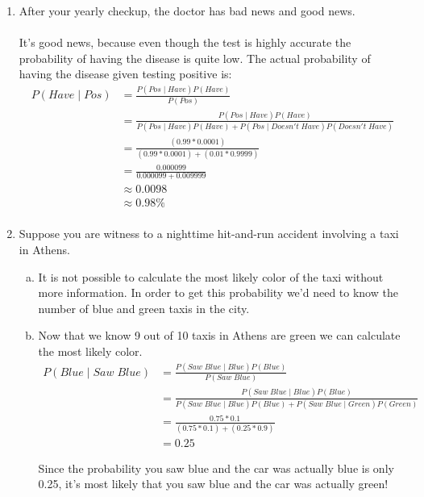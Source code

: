 \documentclass[10pt,draftclsnofoot,onecolumn]{IEEEtran}
\begin{document}
\begin{enumerate}
  \item After your yearly checkup, the doctor has bad news and good news. \\ \\
  It's good news, because even though the test is highly accurate the probability of having the disease is quite low.
  The actual probability of having the disease given testing positive is:
  \begin{align*}
    P(Have \; | \; Pos) &= \frac{P(Pos \; | \; Have)P(Have)}{P(Pos)} \\
    &= \frac{P(Pos \; | \; Have)P(Have)}{P(Pos \; | \; Have)P(Have) + P(Pos \; | \; Doesn't \; Have)P(Doesn't \; Have)} \\
    &= \frac{(0.99*0.0001)}{(0.99*0.0001)+(0.01*0.9999)} \\
    &= \frac{0.000099}{0.000099+0.009999} \\
    &\approx 0.0098 \\
    &\approx 0.98\% \\
  \end{align*}

  \item Suppose you are witness to a nighttime hit-and-run accident involving a taxi in Athens.

  \begin{enumerate}[a)]
    \item It is not possible to calculate the most likely color of the taxi without more information.
    In order to get this probability we'd need to know the number of blue and green taxis in the city.
    \item Now that we know 9 out of 10 taxis in Athens are green we can calculate the most likely color.
    \begin{align*}
      P(Blue \; | \; Saw \; Blue) &= \frac{P(Saw \; Blue \; | \; Blue)P(Blue)}{P(Saw \; Blue)} \\
      &= \frac{P(Saw \; Blue \; | \; Blue)P(Blue)}{P(Saw \; Blue \; | \; Blue)P(Blue)+P(Saw \; Blue \; | \; Green)P(Green)} \\
      &= \frac{0.75*0.1}{(0.75*0.1)+(0.25*0.9)} \\
      &= 0.25
    \end{align*}

    Since the probability you saw blue and the car was actually blue is only 0.25, it's most likely that you saw blue and the car was actually green!

  \end{enumerate}

\end{enumerate}
\end{document}
